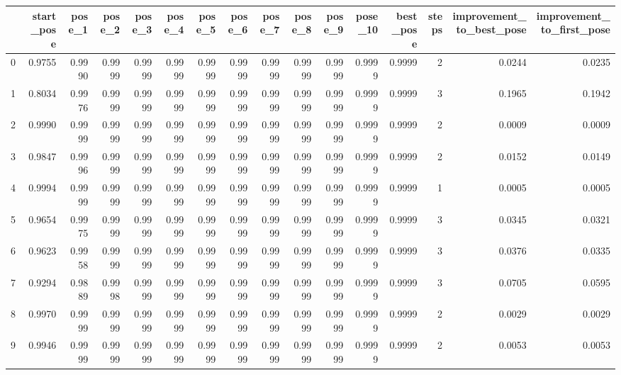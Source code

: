 \begin{tabular}{lrrrrrrrrrrrrrrr}
\toprule
{} &  start\_pose &  pose\_1 &  pose\_2 &  pose\_3 &  pose\_4 &  pose\_5 &  pose\_6 &  pose\_7 &  pose\_8 &  pose\_9 &  pose\_10 &  best\_pose &  steps &  improvement\_to\_best\_pose &  improvement\_to\_first\_pose \\
\midrule
0   &      0.9755 &  0.9990 &  0.9999 &  0.9999 &  0.9999 &  0.9999 &  0.9999 &  0.9999 &  0.9999 &  0.9999 &   0.9999 &     0.9999 &      2 &                    0.0244 &                     0.0235 \\
1   &      0.8034 &  0.9976 &  0.9999 &  0.9999 &  0.9999 &  0.9999 &  0.9999 &  0.9999 &  0.9999 &  0.9999 &   0.9999 &     0.9999 &      3 &                    0.1965 &                     0.1942 \\
2   &      0.9990 &  0.9999 &  0.9999 &  0.9999 &  0.9999 &  0.9999 &  0.9999 &  0.9999 &  0.9999 &  0.9999 &   0.9999 &     0.9999 &      2 &                    0.0009 &                     0.0009 \\
3   &      0.9847 &  0.9996 &  0.9999 &  0.9999 &  0.9999 &  0.9999 &  0.9999 &  0.9999 &  0.9999 &  0.9999 &   0.9999 &     0.9999 &      2 &                    0.0152 &                     0.0149 \\
4   &      0.9994 &  0.9999 &  0.9999 &  0.9999 &  0.9999 &  0.9999 &  0.9999 &  0.9999 &  0.9999 &  0.9999 &   0.9999 &     0.9999 &      1 &                    0.0005 &                     0.0005 \\
5   &      0.9654 &  0.9975 &  0.9999 &  0.9999 &  0.9999 &  0.9999 &  0.9999 &  0.9999 &  0.9999 &  0.9999 &   0.9999 &     0.9999 &      3 &                    0.0345 &                     0.0321 \\
6   &      0.9623 &  0.9958 &  0.9999 &  0.9999 &  0.9999 &  0.9999 &  0.9999 &  0.9999 &  0.9999 &  0.9999 &   0.9999 &     0.9999 &      3 &                    0.0376 &                     0.0335 \\
7   &      0.9294 &  0.9889 &  0.9998 &  0.9999 &  0.9999 &  0.9999 &  0.9999 &  0.9999 &  0.9999 &  0.9999 &   0.9999 &     0.9999 &      3 &                    0.0705 &                     0.0595 \\
8   &      0.9970 &  0.9999 &  0.9999 &  0.9999 &  0.9999 &  0.9999 &  0.9999 &  0.9999 &  0.9999 &  0.9999 &   0.9999 &     0.9999 &      2 &                    0.0029 &                     0.0029 \\
9   &      0.9946 &  0.9999 &  0.9999 &  0.9999 &  0.9999 &  0.9999 &  0.9999 &  0.9999 &  0.9999 &  0.9999 &   0.9999 &     0.9999 &      2 &                    0.0053 &                     0.0053 \\

\end{tabular}
